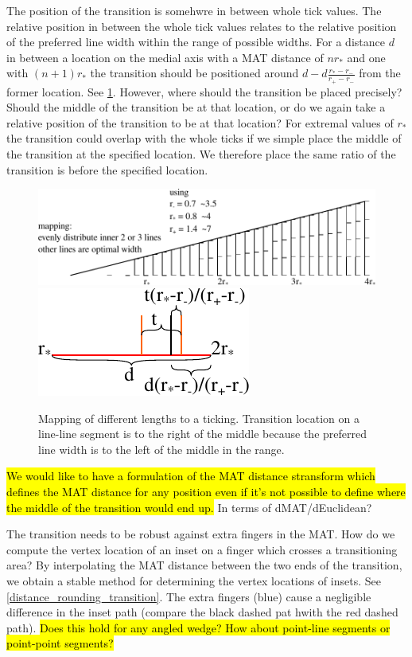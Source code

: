 The position of the transition is somehwre in between whole tick values.
The relative position in between the whole tick values relates to the relative position of the preferred line width within the range of possible widths.
For a distance $d$ in between a location on the medial axis with a MAT distance of $nr_*$ and one with $(n+1)r_*$ the transition should be positioned around $d - d\frac{r_* - r_-}{r_+ - r_-}$ from the former location.
See \cref{transition_location}.
However, where should the transition be placed precisely? Should the middle of the transition be at that location, or do we again take a relative position of the transition to be at that location?
For extremal values of $r_*$ the transition could overlap with the whole ticks if we simple place the middle of the transition at the specified location.
We therefore place the same ratio of the transition is before the specified location.

\begin{figure}[H]
\centering
\includegraphics[width=.9\columnwidth]{sources/method/ticking.pdf}
\includegraphics[width=.5\columnwidth]{sources/method/transition_location_precise.pdf}
\caption{Mapping of different lengths to a ticking. Transition location on a line-line segment is to the right of the middle because the preferred line width is to the left of the middle in the range.}
\label{transition_location}
\end{figure}


\hl{We would like to have a formulation of the MAT distance stransform which defines the MAT distance for any position even if it's not possible to define where the middle of the transition would end up.}
In terms of dMAT/dEuclidean?

The transition needs to be robust against extra fingers in the MAT.
How do we compute the vertex location of an inset on a finger which crosses a transitioning area?
By interpolating the MAT distance between the two ends of the transition, we obtain a stable method for determining the vertex locations of insets.
See \cref{distance_rounding_transition}.
The extra fingers (blue) cause a negligible difference in the inset path (compare the black dashed pat hwith the red dashed path).
\hl{Does this hold for any angled wedge? How about point-line segments or point-point segments?}

